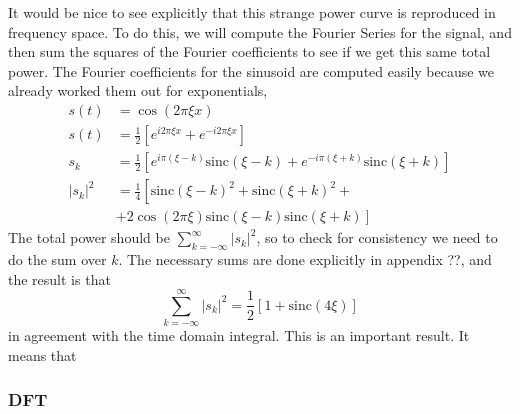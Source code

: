 It would be nice to see explicitly that this strange power curve is
reproduced in frequency space. To do this, we will compute the Fourier
Series for the signal, and then sum the squares of the Fourier coefficients
to see if we get this same total power. The Fourier coefficients for
the sinusoid are computed easily because we already worked them out
for exponentials,\begin{align*}
s(t) & = \cos(2\pi\xi x)\\
s(t) & = \frac{1}{2}\left[e^{i2\pi\xi x}+e^{-i2\pi\xi x}\right]\\
s_{k} & = \frac{1}{2}\left[e^{i\pi(\xi-k)}\textrm{sinc}\left(\xi-k\right)+e^{-i\pi(\xi+k)}\textrm{sinc}\left(\xi+k\right)\right]\\
|s_{k}|^{2} & = \frac{1}{4}\left[\textrm{sinc}\left(\xi-k\right)^{2}+\textrm{sinc}\left(\xi+k\right)^{2}+\right.\\
 & + \left.2\cos\left(2\pi\xi\right)\textrm{sinc}\left(\xi-k\right)\textrm{sinc}\left(\xi+k\right)\right]
\end{align*}
The total power should be $\sum_{k=-\infty}^{\infty}|s_{k}|^{2}$,
so to check for consistency we need to do the sum over $k$. The necessary
sums are done explicitly in appendix ??, and the result is that\[
\sum_{k=-\infty}^{\infty}|s_{k}|^{2}=\frac{1}{2}\left[1+\textrm{sinc}\left(4\xi\right)\right]\]
in agreement with the time domain integral. This is an important result.
It means that 


\subsubsection{DFT}

